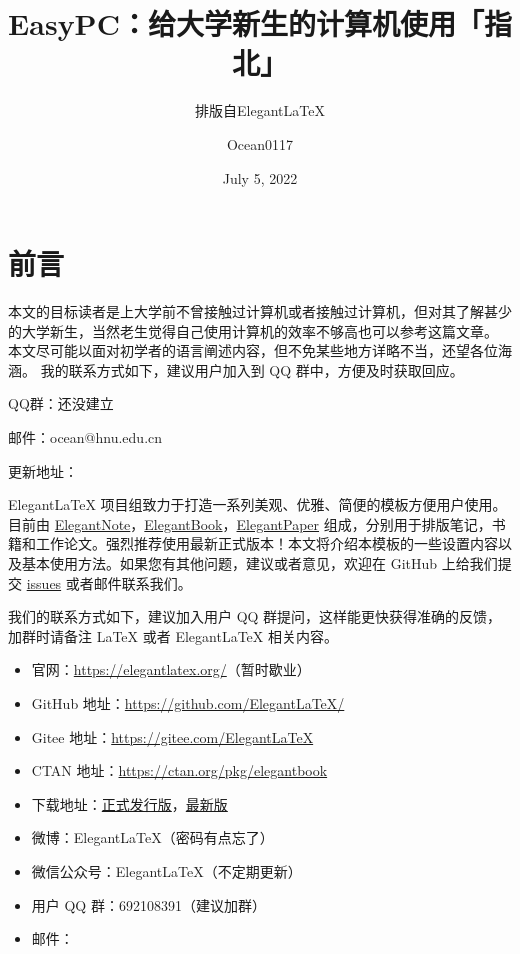 \documentclass[lang=cn,10pt]{elegantbook}
\title{EasyPC：给大学新生的计算机使用「指北」}
\subtitle{排版自Elegant\LaTeX{}}
\author{Ocean0117}
\institute{Hunan University}
\date{July 5, 2022}
\begin{document}
\maketitle
\frontmatter

\tableofcontents

\mainmatter

\chapter{前言}
本文的目标读者是上大学前不曾接触过计算机或者接触过计算机，但对其了解甚少的大学新生，当然老生觉得自己使用计算机的效率不够高也可以参考这篇文章。
本文尽可能以面对初学者的语言阐述内容，但不免某些地方详略不当，还望各位海涵。
我的联系方式如下，建议用户加入到 QQ 群中，方便及时获取回应。
\item QQ群：还没建立
\item 邮件：ocean@hnu.edu.cn
\item 更新地址：


Elegant\LaTeX{} 项目组致力于打造一系列美观、优雅、简便的模板方便用户使用。目前由 \href{https://github.com/ElegantLaTeX/ElegantNote}{ElegantNote}，\href{https://github.com/ElegantLaTeX/ElegantBook}{ElegantBook}，\href{https://github.com/ElegantLaTeX/ElegantPaper}{ElegantPaper} 组成，分别用于排版笔记，书籍和工作论文。强烈推荐使用最新正式版本！本文将介绍本模板的一些设置内容以及基本使用方法。如果您有其他问题，建议或者意见，欢迎在 GitHub 上给我们提交 \href{https://github.com/ElegantLaTeX/ElegantBook/issues}{issues} 或者邮件联系我们。

我们的联系方式如下，建议加入用户 QQ 群提问，这样能更快获得准确的反馈，加群时请备注 \LaTeX{} 或者 Elegant\LaTeX{} 相关内容。
\begin{itemize}
  \item 官网：\href{https://elegantlatex.org/}{https://elegantlatex.org/}（暂时歇业）
  \item GitHub 地址：\href{https://github.com/ElegantLaTeX/}{https://github.com/ElegantLaTeX/}
  \item Gitee 地址：\href{https://gitee.com/ElegantLaTeX}{https://gitee.com/ElegantLaTeX}
  \item CTAN 地址：\href{https://ctan.org/pkg/elegantbook}{https://ctan.org/pkg/elegantbook}
  \item 下载地址：\href{https://github.com/ElegantLaTeX/ElegantBook/releases}{正式发行版}，\href{https://github.com/ElegantLaTeX/ElegantBook/archive/master.zip}{最新版}
  \item 微博：Elegant\LaTeX{}（密码有点忘了）
  \item 微信公众号：Elegant\LaTeX{}（不定期更新）
  \item 用户 QQ 群：692108391（建议加群）
  \item 邮件：
\end{itemize}
\end{document}
